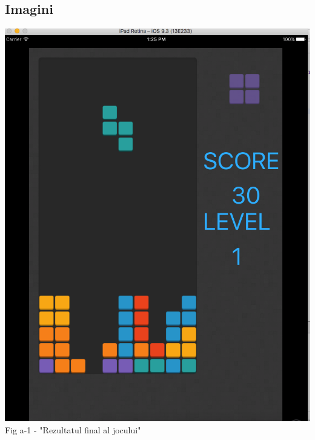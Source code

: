 \subsection{Imagini}
\begin{center}
\vspace{30 mm}
\includegraphics[scale=0.37]{Test1} \\ 
Fig a-1 - "Rezultatul final al jocului" \\
\vspace{10 mm}




\end{center}


